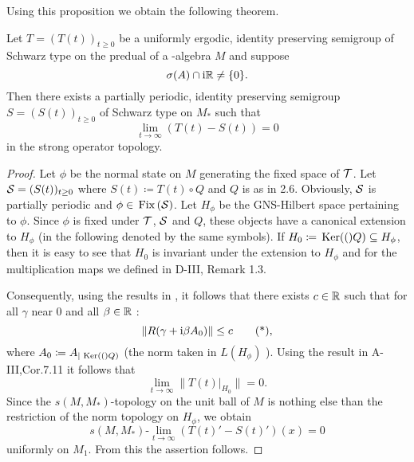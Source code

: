 Using this proposition we obtain the following theorem.
\begin{theorem}\label{thm:d4-3.11}
Let $ T = (T(t))_{t \geq 0} $  be a uniformly ergodic, identity preserving semigroup of Schwarz type on the predual of a \WA-algebra $ M $  and suppose 
%
\[
	\sigma(A) \cap \mathrm{i}\mathbb{R} \neq \{0\} .
\]
%
Then there exists a partially periodic, identity preserving semigroup $ S = (S(t))_{t \geq 0} $  of Schwarz type on $ M_{*} $  such that
\[
\lim_{t \to \infty} (T(t) - S(t)) = 0
\]
in the strong operator topology.
\end{theorem}
\begin{proof}
Let $ \phi $  be the normal state on $ M $  generating the fixed space of $ \mathcal{T} $.
Let $ \mathcal{S} = (S(t))_{t \geq 0} $  where $ S(t) \coloneqq T(t) \circ Q $  and $ Q $  is as in 2.6.
Obviously, $ \mathcal{S} $  is partially periodic and $ \phi \in \mathop{}\mathrm{Fix}\left(\mathcal{S}\right) $.
Let $ H_{\phi} $  be the GNS-Hilbert space pertaining to $ \phi $.
Since $ \phi $  is fixed under $ \mathcal{T} $, $ \mathcal{S} $  and $ Q $,  these objects have a canonical extension to $ H_{\phi} $  (in the following denoted by the same symbols).
If $ H_{0} \coloneqq \mathop{}\mathrm{Ker}(()Q) \subseteq H_{\phi} $,  then it is easy to see that $ H_{0} $  is invariant under the extension to $ H_{\phi} $  and for the multiplication maps we defined in D-III, Remark 1.3.

Consequently, using the results in \citet{grohkuemmerer:1982}, it follows that there exists $ c \in \mathbb{R} $  such that for all $ \gamma $  near $ 0 $  and all $ \beta \in \mathbb{R} $ :
\begin{equation}
\|R(\gamma + \mathrm{i}\beta A_{0})\| \leq c \tag{*} ,
\end{equation}
where $ A_{0} \coloneqq A_{|\mathop{}\mathrm{Ker}(()Q)} $  (the norm taken in $ L(H_{\phi}) $ ).
Using the result in A-III,Cor.7.11 it follows that
\[
\lim_{t \to \infty} \|T(t)|_{H_{0}}\| = 0.
\]
Since the $ s(M,M_{*}) $-topology on the unit ball of $ M $  is nothing else than the restriction of the norm topology on $ H_{\phi} $, we obtain
\[
s(M,M_{*})\text{-}\lim_{t \to \infty} (T(t)' - S(t)')(x) = 0
\]
uniformly on $ M_{1} $.
From this the assertion follows.
\end{proof}
